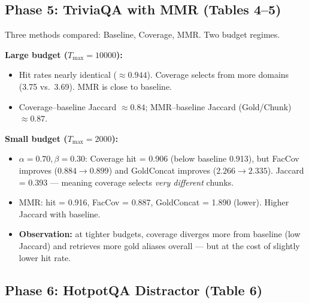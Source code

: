 \documentclass[11pt,a4paper]{article}
\begin{document}
\subsection{Phase 5: TriviaQA with MMR (Tables 4--5)}

Three methods compared: Baseline, Coverage, MMR. Two budget regimes.

\medskip
\noindent\textbf{Large budget ($T_{\max} = 10000$):}
\begin{itemize}[leftmargin=*]
	\item Hit rates nearly identical ($\approx 0.944$). Coverage selects from more domains (3.75 vs.\ 3.69). MMR is close to baseline.
	\item Coverage--baseline Jaccard $\approx 0.84$; MMR--baseline Jaccard (Gold/Chunk) $\approx 0.87$.
\end{itemize}

\noindent\textbf{Small budget ($T_{\max} = 2000$):}
\begin{itemize}[leftmargin=*]
	\item $\alpha = 0.70, \beta = 0.30$: Coverage hit = 0.906 (below baseline 0.913), but FacCov improves ($0.884 \to 0.899$) and GoldConcat improves ($2.266 \to 2.335$). Jaccard = 0.393 --- meaning coverage selects \emph{very different} chunks.
	\item MMR: hit = 0.916, FacCov = 0.887, GoldConcat = 1.890 (lower). Higher Jaccard with baseline.
	\item \textbf{Observation:} at tighter budgets, coverage diverges more from baseline (low Jaccard) and retrieves more gold aliases overall --- but at the cost of slightly lower hit rate.
\end{itemize}

\subsection{Phase 6: HotpotQA Distractor (Table 6)}
\end{document}
